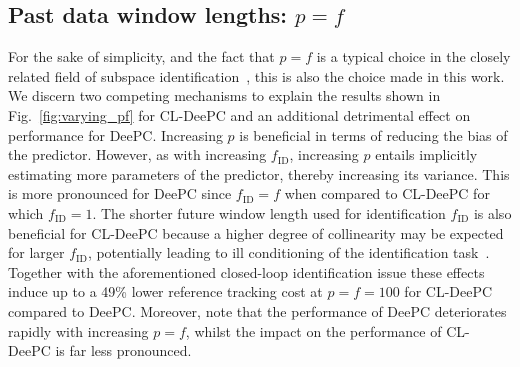 
\subsection{Past data window lengths: $p=f$}
\noindent For the sake of simplicity, and the fact that $p=f$ is a typical choice in the closely related field of subspace identification~\citep{vanderVeen2013}, this is also the choice made in this work. We discern two competing mechanisms to explain the results shown in Fig.~\ref{fig:varying_pf} for \ac{CL-DeePC} and an additional detrimental effect on performance for \ac{DeePC}. Increasing $p$ is beneficial in terms of reducing the bias of the predictor. However, as with increasing $f_\mathrm{ID}$, increasing $p$ entails implicitly estimating more parameters of the predictor, thereby increasing its variance. This is more pronounced for \ac{DeePC} since $f_\mathrm{ID}=f$ when compared to \ac{CL-DeePC} for which $f_\mathrm{ID}=1$. The shorter future window length used for identification $f_\mathrm{ID}$ is also beneficial for \ac{CL-DeePC} because a higher degree of collinearity may be expected for larger $f_\mathrm{ID}$, potentially leading to ill conditioning of the identification task~\citep{Chiuso2004}. Together with the aforementioned closed-loop identification issue these effects induce up to a 49\% lower reference tracking cost at $p=f=100$ for \ac{CL-DeePC} compared to \ac{DeePC}. Moreover, note that the performance of \ac{DeePC} deteriorates rapidly with increasing $p=f$, whilst the impact on the performance of \ac{CL-DeePC} is far less pronounced.
